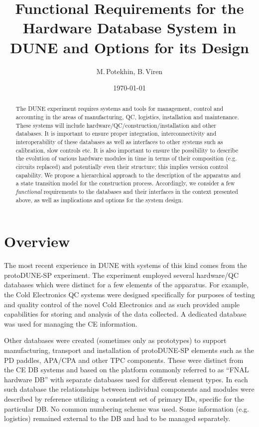 \documentclass[pdftex,12pt,letter]{article}
\title{Functional Requirements for the Hardware Database System in DUNE and Options for its Design}
\date{\today}
\author{M.\,Potekhin, B.\,Viren}
\begin{document}
\maketitle

\begin{abstract}
\noindent  The DUNE experiment requires systems and tools for management, control
and accounting  in the areas of manufacturing, QC, logistics, installation and maintenance.
These systems will include hardware/QC/construction/installation and other databases.
It is important to ensure proper integration, interconnectivity and interoperability of these
databases  as well as interfaces to other systems such as calibration, slow controls etc.
It is also important to ensure the possibility to describe the evolution of various hardware modules
in time in terms of their composition (e.g. circuits replaced) and potentially even their structure;
this implies version control capability.
We propose a hierarchical approach to the description of the apparatus and a state transition
model for the construction process. Accordingly, we consider a few \textit{functional}
requirements to the databases and their interfaces  in the context presented above,
as well as implications and options for the system design.

\end{abstract}


\section{Overview}

The most recent experience in DUNE with systems of this kind comes from the protoDUNE-SP
experiment. The experiment employed several hardware/QC databases which were distinct
for a few elements of the apparatus. For example, the Cold Electronics QC systems were designed specifically
for purposes of testing and quality control of the novel Cold Electronics and as such provided ample capabilities
for storing and analysis of the data collected. A dedicated database was used for managing the CE information.

Other databases were created (sometimes only as prototypes) to support manufacturing, transport and installation of 
protoDUNE-SP elements such as the PD paddles, APA/CPA and other TPC components. These were distinct from
the CE DB systems and based on the platform commonly referred to as ``FNAL hardware DB'' \cite{hardwareDB}
with separate databases used for different element types. In each such database the
relationships between individual components and modules were described by reference utilizing a
consistent set of primary IDs, specific for the particular DB. No common numbering scheme was used.
Some information (e.g.\,logistics) remained external to the DB and had to be managed separately.
\end{document}
